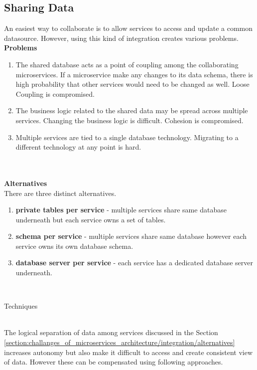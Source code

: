 \subsection{Sharing Data}\label{section:challanges_of_microservices_architecture/integration/sharing_data}
An easiest way to collaborate is to allow services to access and update a common datasource. However, using this kind of integration creates various problems.\cite{Newman:2015aa}\\
\textbf{Problems}\label{section:challanges_of_microservices_architecture/integration/problems}
\begin{enumerate}
\item The shared database acts as a point of coupling among the collaborating microservices. If a microservice make any changes to its data schema, there is high probability that other services would need to be changed as well. Loose Coupling is compromised.
\item The business logic related to the shared data may be spread across multiple services. Changing the business logic is difficult. Cohesion is compromised.
\item Multiple services are tied to a single database technology. Migrating to a different technology at any point is hard.
\end{enumerate}
\\
\\
\textbf{Alternatives}\label{section:challanges_of_microservices_architecture/integration/alternatives}
\\
There are three distinct alternatives.\cite{Richardson:2015aa}
\begin{enumerate}
\item \textbf{private tables per service} - multiple services share same database underneath but each service owns a set of tables.
\item \textbf{schema per service} - multiple services share same database however each service owns its own database schema.
\item \textbf{database server per service} - each service has a dedicated database server underneath.
\end{enumerate}
\\
\begin{shaded}Techniques\end{shaded}\label{section:challanges_of_microservices_architecture/integration/sharing_data/techniques}
\\
The logical separation of data among services discussed in the Section \ref{section:challanges_of_microservices_architecture/integration/alternatives} increases autonomy but also make it difficult to access and create consistent view of data. However these can be compensated using following approaches.\cite{Richardson:2016aa} \cite{Richardson:2015aa}
